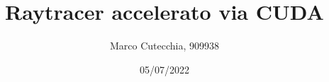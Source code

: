 \documentclass[12pt]{article}
\begin{document}
\title{Raytracer accelerato via CUDA}
\author{Marco Cutecchia, 909938}
\date{05/07/2022}

\maketitle

\section{}
\end{document}
